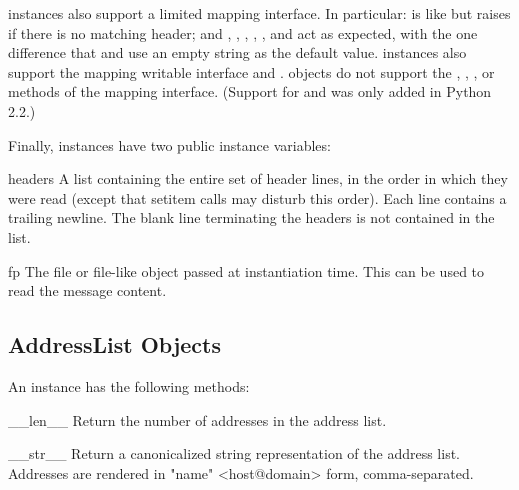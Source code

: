  instances also support a limited mapping interface.
In particular:  is like
 but raises  if
there is no matching header; and ,
,
, ,
 , and
 act as expected,
with the one difference that  and 
use an empty string as the default value.   instances
also support the mapping writable interface  and .   objects do not
support the , , , or
 methods of the mapping interface.  (Support for
 and  was only added in Python
2.2.)

Finally,  instances have two public instance variables:

\begin{memberdesc}{headers}
A list containing the entire set of header lines, in the order in
which they were read (except that setitem calls may disturb this
order). Each line contains a trailing newline.  The
blank line terminating the headers is not contained in the list.
\end{memberdesc}

\begin{memberdesc}{fp}
The file or file-like object passed at instantiation time.  This can
be used to read the message content.
\end{memberdesc}


\subsection{AddressList Objects \label{addresslist-objects}}

An  instance has the following methods:

\begin{methoddesc}{__len__}{}
Return the number of addresses in the address list.
\end{methoddesc}

\begin{methoddesc}{__str__}{}
Return a canonicalized string representation of the address list.
Addresses are rendered in "name" <host@domain> form, comma-separated.
\end{methoddesc}


